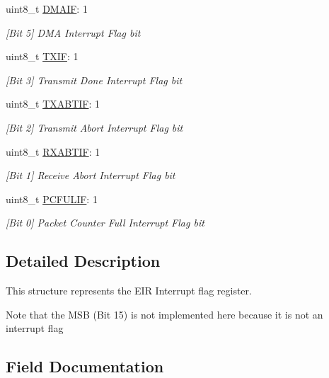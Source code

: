 \begin{DoxyCompactItemize}
uint8\+\_\+t \mbox{\hyperlink{structinterrupt_flags_ac03ab9621d33c1e860f64dbcf0fa2a3e}{D\+M\+A\+IF}}\+: 1
\begin{DoxyCompactList}\small\item\em \mbox{[}Bit 5\mbox{]} D\+MA Interrupt Flag bit \end{DoxyCompactList}\item 
uint8\+\_\+t \mbox{\hyperlink{structinterrupt_flags_a8ac6b64dff7b25ddf36cea5543329e56}{T\+X\+IF}}\+: 1
\begin{DoxyCompactList}\small\item\em \mbox{[}Bit 3\mbox{]} Transmit Done Interrupt Flag bit \end{DoxyCompactList}\item 
uint8\+\_\+t \mbox{\hyperlink{structinterrupt_flags_aef79dc4f43ab3844327f963cedfc3a57}{T\+X\+A\+B\+T\+IF}}\+: 1
\begin{DoxyCompactList}\small\item\em \mbox{[}Bit 2\mbox{]} Transmit Abort Interrupt Flag bit \end{DoxyCompactList}\item 
uint8\+\_\+t \mbox{\hyperlink{structinterrupt_flags_adfd2bd74bfbf9d086ac5364f2c2bc420}{R\+X\+A\+B\+T\+IF}}\+: 1
\begin{DoxyCompactList}\small\item\em \mbox{[}Bit 1\mbox{]} Receive Abort Interrupt Flag bit \end{DoxyCompactList}\item 
uint8\+\_\+t \mbox{\hyperlink{structinterrupt_flags_a54ca36edd15d3a43ea58c44c9b4632d1}{P\+C\+F\+U\+L\+IF}}\+: 1
\begin{DoxyCompactList}\small\item\em \mbox{[}Bit 0\mbox{]} Packet Counter Full Interrupt Flag bit \end{DoxyCompactList}\end{DoxyCompactItemize}


\subsection{Detailed Description}
This structure represents the E\+IR Interrupt flag register. 

Note that the M\+SB (Bit 15) is not implemented here because it is not an interrupt flag 

\subsection{Field Documentation}
\mbox{\label{structinterrupt_flags_a710067270606b70dbaf2bbb5aadb5ce9}} 

